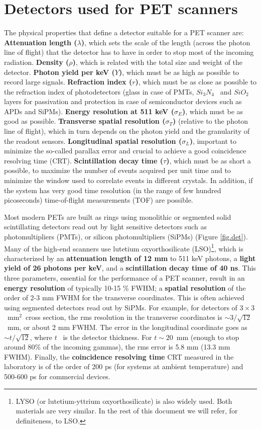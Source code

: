 \documentclass[review]{elsarticle}
\begin{document}
\section{Detectors used for PET scanners}
\label{sec.det}

The physical properties that define a detector suitable for a PET scanner are: 
{\bf Attenuation length ($\lambda$)}, which sets the scale of the length (across the photon line of flight) that the detector has to have in order to stop most of the incoming radiation.
{\bf Density ($\rho$)}, which is related with the total size and weight of the detector.
{\bf Photon yield per keV ($Y$)}, which must be as high as possible to record large signals. 
{\bf Refraction index ($r$)}, which must be as close as possible to the refraction index of photodetectors (glass in case of PMTs, $Si_3N_4$~ and $SiO_2$ layers for passivation and protection in case of semiconductor devices such as APDs and SiPMs). 
{\bf Energy resolution at 511 keV ($\sigma_E$)}, which must be as good as possible. 
{\bf Transverse spatial resolution ($\sigma_T$)} (relative to the photon line of flight), which in turn depends on the photon yield and the granularity of the readout sensors.
{\bf Longitudinal spatial resolution ($\sigma_L$)}, important to minimize the so-called parallax error and crucial to achieve a good coincidence resolving time (CRT).   
{\bf Scintillation decay time ($\tau$)}, which must be as short a possible, to maximize the number of events acquired per unit time and to minimize the window used to correlate events in different crystals. In addition, if the system has very good time resolution (in the range of few hundred picoseconds) time-of-flight measurements (TOF) are possible. 

Most modern PETs are built as rings using monolithic or segmented solid scintillating detectors read out by light sensitive detectors such as photomultipliers (PMTs), or silicon photomultipliers (SiPMs) (Figure \ref{fig.det}). Many of the high-end scanners use lutetium oxyorthosilicate (LSO)\footnote{LYSO (or lutetium-yttrium oxyorthosilicate) is also widely used. Both materials are very similar. In the rest of this document we will refer, for definiteness, to LSO.}, which is characterized by an {\bf attenuation length of 12 mm} to 511 keV photons, a  {\bf light yield of 26 photons per keV}, and a {\bf scintillation decay time of 40 ns}. This three parameters, essential for the performance of a PET scanner, result in an {\bf energy resolution} of typically 10-15 \% FWHM; a {\bf spatial resolution} of the order of 2-3 mm FWHM for the transverse coordinates. This is often achieved using segmented detectors read out by SiPMs. For example, for detectors of $3 \times 3$~mm$^2$~cross section, the rms resolution in the transverse coordinates is $\sim 3/\sqrt{12}$~mm, or about 2 mm FWHM. The error in 
the longitudinal coordinate goes as $\sim t/\sqrt{12}$, where $t$~ is the detector thickness. For $t \sim 20$~mm (enough to stop around 80\% of the incoming gammas), the rms error is 5.8 mm (13.3 mm FWHM). Finally, the {\bf coincidence resolving time} CRT measured in the laboratory is of the order of 200 ps (for systems at ambient temperature) and 500-600 ps for commercial devices.
\end{document}

